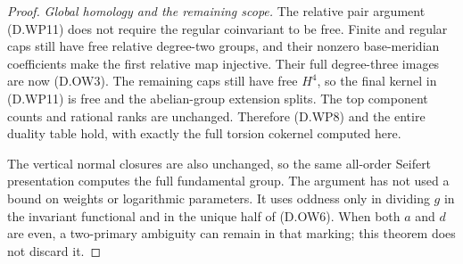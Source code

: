 \begin{proof}
\emph{Global homology and the remaining scope.}
The relative pair argument (D.WP11) does not
require the regular coinvariant to be free.
Finite and regular caps still have free
relative degree-two groups, and their
nonzero base-meridian coefficients make the
first relative map injective. Their full
degree-three images are now (D.OW3).
The remaining caps still have free
$H^4$, so the final kernel in (D.WP11) is
free and the abelian-group extension splits.
The top component counts and rational ranks
are unchanged. Therefore (D.WP8) and the
entire duality table hold, with exactly the
full torsion cokernel computed here.

The vertical normal closures are also unchanged,
so the same all-order Seifert presentation
computes the full fundamental group.
The argument has not used a bound on weights
or logarithmic parameters. It uses oddness
only in dividing $g$ in the invariant functional
and in the unique half of (D.OW6). When both
$a$ and $d$ are even, a two-primary ambiguity
can remain in that marking; this theorem
does not discard it.
\end{proof}
